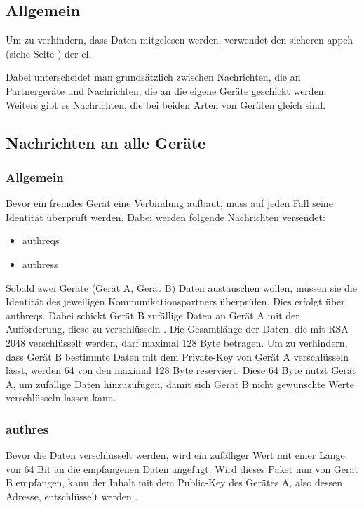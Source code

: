 \subsection{Allgemein}
Um zu verhindern, dass Daten mitgelesen werden, verwendet \sblit den sicheren \gls{appch} (siehe Seite \pageref{dcl-appch}) der \gls{cl}.

Dabei unterscheidet man grundsätzlich zwischen Nachrichten, die an Partnergeräte  und Nachrichten, die an die eigene Geräte geschickt werden. Weiters gibt es Nachrichten, die bei beiden Arten von Geräten gleich sind.

\subsection{Nachrichten an alle Geräte}
\subsubsection{Allgemein}
Bevor ein fremdes Gerät eine Verbindung aufbaut, muss auf jeden Fall seine Identität überprüft werden. Dabei werden folgende Nachrichten versendet:
\begin{itemize}
	\item \gls{authreq}s
	\item \gls{authres}s
\end{itemize}
\sblitauthreqbytefield

Sobald zwei Geräte (Gerät A, Gerät B) Daten austauschen wollen, müssen sie die Identität des jeweiligen Kommunikationspartners überprüfen. Dies erfolgt über \gls{authreq}s. Dabei schickt Gerät B zufällige Daten an Gerät A mit der Aufforderung, diese zu verschlüsseln . 
Die Gesamtlänge der Daten, die mit RSA-2048 verschlüsselt werden, darf maximal 128 Byte betragen. Um zu verhindern, dass Gerät B bestimmte Daten mit dem Private-Key von Gerät A verschlüsseln lässt, werden 64 von den maximal 128 Byte reserviert. Diese 64 Byte nutzt Gerät A, um zufällige Daten hinzuzufügen, damit sich Gerät B nicht gewünschte Werte verschlüsseln lassen kann.

\subsubsection{\gls{authres}}
\sblitauthresbytefield
Bevor die Daten verschlüsselt werden, wird ein zufälliger Wert mit einer Länge von 64 Bit an die empfangenen Daten angefügt.
Wird dieses Paket nun von Gerät B empfangen, kann der Inhalt mit dem Public-Key des Gerätes A, also dessen Adresse, entschlüsselt werden .
		
